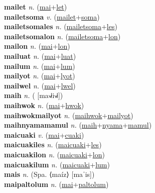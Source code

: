 \textbf{mailet} \textit{n.} (\hyperref[mai]{mai}+\hyperref[let]{let})
 \label{mailet} \\
\textbf{mailetsoma} \textit{v.} (\hyperref[mailet]{mailet}+\hyperref[soma]{soma})
 \label{mailetsoma} \\
\textbf{mailetsomales} \textit{n.} (\hyperref[mailetsoma]{mailetsoma}+\hyperref[les]{les})
 \label{mailetsomales} \\
\textbf{mailetsomalon} \textit{n.} (\hyperref[mailetsoma]{mailetsoma}+\hyperref[lon]{lon})
 \label{mailetsomalon} \\
\textbf{mailon} \textit{n.} (\hyperref[mai]{mai}+\hyperref[lon]{lon})
 \label{mailon} \\
\textbf{mailuat} \textit{n.} (\hyperref[mai]{mai}+\hyperref[luat]{luat})
 \label{mailuat} \\
\textbf{mailum} \textit{n.} (\hyperref[mai]{mai}+\hyperref[lum]{lum})
 \label{mailum} \\
\textbf{mailyot} \textit{n.} (\hyperref[mai]{mai}+\hyperref[lyot]{lyot})
 \label{mailyot} \\
\textbf{mailwel} \textit{n.} (\hyperref[mai]{mai}+\hyperref[lwel]{lwel})
 \label{mailwel} \\
\textbf{maih} \textit{n.} ( [ma˧˩˧i˧˩˧])
 \label{maih} \\
\textbf{maihwok} \textit{n.} (\hyperref[mai]{mai}+\hyperref[hwok]{hwok})
 \label{maihwok} \\
\textbf{maihwokmailyot} \textit{n.} (\hyperref[maihwok]{maihwok}+\hyperref[mailyot]{mailyot})
 \label{maihwokmailyot} \\
\textbf{maihnyamamamul} \textit{n.} (\hyperref[maih]{maih}+\hyperref[nyama]{nyama}+\hyperref[mamul]{mamul})
 \label{maihnyamamamul} \\
\textbf{maicuaki} \textit{v.} (\hyperref[mai]{mai}+\hyperref[cuaki]{cuaki})
 \label{maicuaki} \\
\textbf{maicuakiles} \textit{n.} (\hyperref[maicuaki]{maicuaki}+\hyperref[les]{les})
 \label{maicuakiles} \\
\textbf{maicuakilon} \textit{n.} (\hyperref[maicuaki]{maicuaki}+\hyperref[lon]{lon})
 \label{maicuakilon} \\
\textbf{maicuakilum} \textit{n.} (\hyperref[maicuaki]{maicuaki}+\hyperref[lum]{lum})
 \label{maicuakilum} \\
\textbf{mais} \textit{n.} (Spa. ⟨maíz⟩ [maˈis])
 \label{mais} \\
\textbf{maipaltolum} \textit{n.} (\hyperref[mai]{mai}+\hyperref[paltolum]{paltolum})
